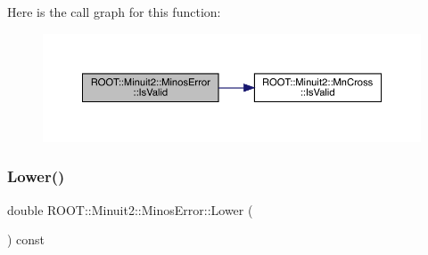 Here is the call graph for this function\+:
\nopagebreak
\begin{figure}[H]
\begin{center}
\leavevmode
\includegraphics[width=350pt]{d2/dd1/classROOT_1_1Minuit2_1_1MinosError_af6b7accfe397a06417ecc1f989d82e00_cgraph}
\end{center}
\end{figure}
\mbox{\label{classROOT_1_1Minuit2_1_1MinosError_ac412aab9b0a59a427fbe7e3cfad47f0c}} 
\subsubsection{\texorpdfstring{Lower()}{Lower()}\hspace{0.1cm}{\footnotesize\ttfamily [1/2]}}
{\footnotesize\ttfamily double R\+O\+O\+T\+::\+Minuit2\+::\+Minos\+Error\+::\+Lower (\begin{DoxyParamCaption}{ }\end{DoxyParamCaption}) const\hspace{0.3cm}{\ttfamily [inline]}}

